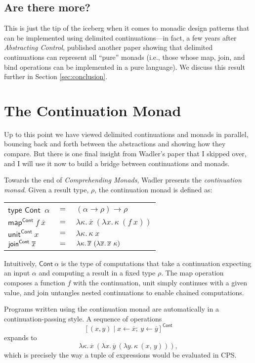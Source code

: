 \documentclass[acmsmall, nonacm, screen]{acmart}
\newcommand\doverline[1]{%
  \setbox0=\hbox{$\overline{#1}$}%
  \ht0=\dimexpr\ht0-.30ex\relax%
  \overline{\copy0}%
}
\newcommand{\lambdaE}[2]{\lambda #1.\, #2}
\newcommand{\map}[3]{\textsf{map}^{\textsf{#1}}~#2~#3}
\newcommand{\unit}[2]{\textsf{unit}^{\textsf{#1}}~#2}
\newcommand{\join}[2]{\textsf{join}^{\textsf{#1}}~#2}
\begin{document}
\subsection{Are there more?}
This is just the tip of the iceberg when it comes to monadic design patterns that can be
implemented using delimited continuations---in fact, a few years after {\em Abstracting Control},
\citet{filinski1994representing} published another paper showing that delimited continuations can
represent all ``pure'' monads (i.e., those whose \textsf{map}, \textsf{join}, and \textsf{bind}
operations can be implemented in a pure language). We discuss this result further in Section
\ref{sec:conclusion}.

\section{The Continuation Monad} \label{sec:contmonad}
Up to this point we have viewed delimited continuations and monads in parallel, bouncing back and
forth between the abstractions and showing how they compare. But there is one final insight from
Wadler's paper that I skipped over, and I will use it now to build a bridge between continuations
and monads.

Towards the end of {\em Comprehending Monads}, Wadler presents the {\em continuation monad}.
Given a result type, $\rho$, the continuation monad is defined as:
\begin{center}
  \begin{tabular}{lll}
    $\textsf{type Cont}$~$\alpha$ & $=$ & $(\alpha \to \rho) \to \rho$ \\
    $\map{Cont}{f}{\overline{x}}$ & $=$ & $\lambdaE{\kappa}{\overline{x}~(\lambdaE{x}{\kappa~(f~x)})}$ \\
    $\unit{Cont}{x}$ & $=$ & $\lambdaE{\kappa}{\kappa~x}$ \\
    $\join{Cont}{\doverline{x}}$ & $=$ &
      $\lambdaE{\kappa}{\doverline{x}~(\lambdaE{\overline{x}}{\overline{x}~\kappa})}$
  \end{tabular}
\end{center}
Intuitively, $\textsf{Cont}~\alpha$ is the type of computations that take a continuation
expecting an input $\alpha$ and computing a result in a fixed type $\rho$. The \textsf{map}
operation composes a function $f$ with the continuation, \textsf{unit} simply continues with a
given value, and \textsf{join} untangles nested continuations to enable chained computations.

Programs written using the continuation monad are automatically in a continuation-passing style.
A sequence of operations
\[ [(x, y) \mid x \leftarrow \overline{x};\ y \leftarrow \overline{y}]^{\textsf{Cont}} \]
expands to
\[ \lambdaE{\kappa}{\overline{x}~(\lambdaE{x}{\overline{y}~(\lambdaE{y}{\kappa~(x,\, y)})})}, \]
which is precisely the way a tuple of expressions would be evaluated in CPS.
\end{document}
